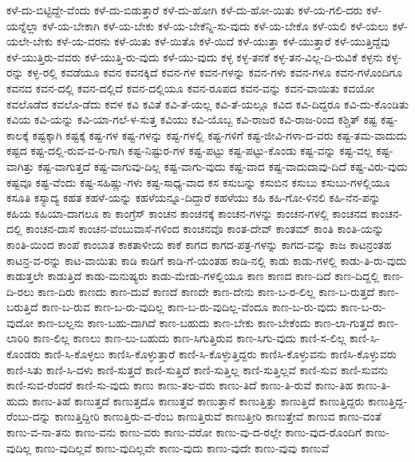 {ಕಳೆ-ದು-ಬಿಟ್ಟಿದ್ದೇ-ವೆಂದು
ಕಳೆ-ದು-ಬಿಡುತ್ತಾರೆ
ಕಳೆ-ದು-ಹೋಗಿ
ಕಳೆ-ದು-ಹೋ-ಯಿತು
ಕಳೆ-ಯ-ಗಲಿ-ದರು
ಕಳೆ-ಯನ್ನೆಲ್ಲಾ
ಕಳೆ-ಯ-ಬೇಕಾಗಿ
ಕಳೆ-ಯ-ಬೇಕು
ಕಳೆ-ಯ-ಬೇಕೆನ್ನಿ-ಸು-ವುದು
ಕಳೆ-ಯ-ಬೇಕೊ
ಕಳೆ-ಯಲಿ
ಕಳೆ-ಯಲು
ಕಳೆ-ಯಲೇ-ಬೇಕು
ಕಳೆ-ಯ-ವರನು
ಕಳೆ-ಯಿತು
ಕಳೆ-ಯಿತೊ
ಕಳೆ-ಯಿದೆ
ಕಳೆ-ಯುತ್ತಾ
ಕಳೆ-ಯುತ್ತಾರೆ
ಕಳೆ-ಯುತ್ತಿದ್ದೆವು
ಕಳೆ-ಯುತ್ತಿರು-ವವರು
ಕಳೆ-ಯುತ್ತಿ-ರು-ವುದು
ಕಳೆ-ಯು-ವುದು
ಕಳ್ಳ
ಕಳ್ಳ-ತನಕೆ
ಕಳ್ಳ-ತನ-ವಿಲ್ಲ-ದಿ-ರುವಿಕೆ
ಕಳ್ಳನು
ಕಳ್ಳ-ರನ್ನು
ಕಳ್ಳ-ರಲ್ಲಿ
ಕವಡೆಯೂ
ಕವನ
ಕವನಕ್ಕಿದೆ
ಕವನ-ಗಳ
ಕವನ-ಗಳನ್ನು
ಕವನ-ಗಳು
ಕವನ-ಗಳೂ
ಕವನ-ಗಳೊಂದಿಗೂ
ಕವನದ
ಕವನ-ದಲ್ಲಿ
ಕವನ-ದಲ್ಲಿದೆ
ಕವನ-ದಲ್ಲಿಯೂ
ಕವನ-ರೂಪದ
ಕವನ-ವನ್ನು
ಕವನ-ವಾಯಿತು
ಕವಯೋ
ಕವಲೊಡೆದ
ಕವಲೊ-ಡೆದು
ಕವಳ
ಕವಿ
ಕವಿತೆ
ಕವಿ-ತೆ-ಯಲ್ಲ
ಕವಿ-ತೆ-ಯಲ್ಲೂ
ಕವಿದ
ಕವಿ-ದಿದ್ದರೂ
ಕವಿ-ದು-ಕೊಂಡಿತು
ಕವಿಯ
ಕವಿ-ಯನ್ನು
ಕವಿ-ಯಾ-ಗಲೆ-ಳ-ಸುತ್ತ
ಕವಿಯು
ಕವಿ-ಯೊಬ್ಬ
ಕವಿ-ರಾಜರ
ಕವಿ-ರಾಜ-ರಿಂದ
ಕಶ್ಚಿತ್
ಕಷ್ಟ
ಕಷ್ಟ-ಕಾಲಕ್ಕೆ
ಕಷ್ಟಕ್ಕಾಗಿ
ಕಷ್ಟಕ್ಕೆ
ಕಷ್ಟ-ಗಳ
ಕಷ್ಟ-ಗಳನ್ನು
ಕಷ್ಟ-ಗಳಲ್ಲಿ
ಕಷ್ಟ-ಗಳಿಗೆ
ಕಷ್ಟ-ಜೀವಿ-ಗಳಾ-ದ-ವರು
ಕಷ್ಟ-ತಮ-ವಾದುದು
ಕಷ್ಟದ
ಕಷ್ಟ-ದಲ್ಲಿ-ರುವ-ವ-ರಿ-ಗಾಗಿ
ಕಷ್ಟ-ನಿಷ್ಟುರ-ಗಳ
ಕಷ್ಟ-ಪಟ್ಟು
ಕಷ್ಟ-ಪಟ್ಟು-ಕೊಂಡು
ಕಷ್ಟ-ವನ್ನು
ಕಷ್ಟ-ವಲ್ಲ
ಕಷ್ಟ-ವಾಗಿತ್ತು
ಕಷ್ಟ-ವಾಗುತ್ತದೆ
ಕಷ್ಟ-ವಾಗುವು-ದಿಲ್ಲ
ಕಷ್ಟ-ವಾಗು-ವುದು
ಕಷ್ಟ-ವಾದ
ಕಷ್ಟ-ವಾದುದಾವು-ದಿದೆ
ಕಷ್ಟ-ವಿರು-ವುದು
ಕಷ್ಟವೂ
ಕಷ್ಟ-ವೆಂದು
ಕಷ್ಟ-ಸಹಿಷ್ಣು-ಗಳು
ಕಷ್ಟ-ಸಾಧ್ಯ-ವಾದ
ಕಸ
ಕಸುಬನ್ನು
ಕಸುಬಿನ
ಕಸುಬು
ಕಸುಬು-ಗಳಲ್ಲಿಯೂ
ಕಸೂತಿ
ಕಸ್ಯಾದ್ಯ
ಕಹತ
ಕಹಳೆ-ಯನ್ನು
ಕಹಳೆಯನ್ನೂ-ದಿದ್ದಾರೆ
ಕಹಳೆಯು
ಕಹಿ
ಕಹಿ-ಗೋ-ಳಿನಲಿ
ಕಹಿ-ನೆನ-ಪನ್ನು
ಕಹಿಯ
ಕಹಿಯಾ-ದಾಗಲೂ
ಕಾ
ಕಾಂಗ್ರೆಸ್
ಕಾಂಚನ
ಕಾಂಚನಕ್ಕೆ
ಕಾಂಚನ-ಗಳನ್ನು
ಕಾಂಚನ-ಗಳಲ್ಲಿ
ಕಾಂಚನದ
ಕಾಂಚನ-ದಲ್ಲಿ
ಕಾಂಚನ-ದಾಸೆ
ಕಾಂಚನ-ವೆಂಬುವಾಸೆ-ಗಳಿಂದ
ಕಾಂಚನವೊ
ಕಾಂತ-ದೇವ್
ಕಾಂತಮ್
ಕಾಂತಿ
ಕಾಂತಿ-ಯನ್ನು
ಕಾಂತಿ-ಯಿಂದ
ಕಾಂಪೆ
ಕಾಂಬಾತ
ಕಾಕತಾಳೀಯ
ಕಾಕೆ
ಕಾಗದ
ಕಾಗದ-ಪತ್ರ-ಗಳನ್ನು
ಕಾಗದ-ವನ್ನು
ಕಾಜ
ಕಾಟನ್ರಂತಹ
ಕಾಟನ್ರ-ವ-ರನ್ನು
ಕಾಟ-ವಾಯಿತು
ಕಾಡಿ
ಕಾಡಿಗೆ
ಕಾಡಿ-ಗೆ-ಯಂತಹ
ಕಾಡಿ-ನಲ್ಲಿ
ಕಾಡು
ಕಾಡು-ಗಳಲ್ಲಿ
ಕಾಡು-ತಿ-ರು-ವುದು
ಕಾಡುತ್ತಲೇ
ಕಾಡುತ್ತಿದೆ
ಕಾಡು-ಮನುಷ್ಯರು
ಕಾಡು-ಮೇಡು-ಗಳಲ್ಲಿಯೂ
ಕಾಣ
ಕಾಣದ
ಕಾಣ-ದಿದೆ
ಕಾಣ-ದಿದ್ದಲ್ಲಿ
ಕಾಣ-ದಿ-ರಲು
ಕಾಣ-ದಿರು
ಕಾಣದು
ಕಾಣ-ದುವೆ
ಕಾಣದೆ
ಕಾಣದೇ
ಕಾಣ-ದೇನು
ಕಾಣ-ಬ-ರ-ಲಿಲ್ಲ
ಕಾಣ-ಬ-ರುತ್ತದೆ
ಕಾಣ-ಬರುತ್ತಿದೆ
ಕಾಣ-ಬ-ರುವ
ಕಾಣ-ಬ-ರು-ವುದಿಲ್ಲ
ಕಾಣ-ಬ-ರು-ವುದಿಲ್ಲ-ವೆಂದೂ
ಕಾಣ-ಬ-ರು-ವುದು
ಕಾಣ-ಬ-ರು-ವುದೋ
ಕಾಣ-ಬಲ್ಲನು
ಕಾಣ-ಬಹು-ದಾಗಿದೆ
ಕಾಣ-ಬಹುದು
ಕಾಣ-ಬೇಕು
ಕಾಣ-ಬೇಕೆಂದು
ಕಾಣ-ಲಾ-ಗುತ್ತದೆ
ಕಾಣ-ಲಾರಿರಿ
ಕಾಣ-ಲಿಲ್ಲ
ಕಾಣಲು
ಕಾಣ-ಲು-ಬಹುದು
ಕಾಣ-ಸಿಗುತ್ತಿರುವ
ಕಾಣ-ಸಿಗು-ವುದು
ಕಾಣಿ-ಸ-ಲಿಲ್ಲ
ಕಾಣಿ-ಸಿ-ಕೊಂಡರು
ಕಾಣಿ-ಸಿ-ಕೊಳ್ಳಲು
ಕಾಣಿಸಿ-ಕೊಳ್ಳುತ್ತಾರೆ
ಕಾಣಿ-ಸಿ-ಕೊಳ್ಳುತ್ತಿದ್ದರು
ಕಾಣಿಸಿ-ಕೊಳ್ಳುವನು
ಕಾಣಿಸಿ-ಕೊಳ್ಳುವರು
ಕಾಣಿ-ಸಿತು
ಕಾಣಿ-ಸಿ-ದಳು
ಕಾಣಿ-ಸುತ್ತದೆ
ಕಾಣಿ-ಸುತ್ತಿದೆ
ಕಾಣಿ-ಸುತ್ತಿಲ್ಲ
ಕಾಣಿ-ಸುತ್ತಿಲ್ಲವೆ
ಕಾಣಿ-ಸುವ
ಕಾಣಿ-ಸುವನು
ಕಾಣಿ-ಸುವ-ರೆಂದರೆ
ಕಾಣಿ-ಸು-ವುದು
ಕಾಣು
ಕಾಣು-ತಲ-ವರು
ಕಾಣು-ತಿದೆ
ಕಾಣು-ತಿ-ರುವೆ
ಕಾಣು-ತಿಹ
ಕಾಣು-ತಿ-ಹುದು
ಕಾಣು-ತಿಹೆ
ಕಾಣುತ್ತದೆ
ಕಾಣುತ್ತದೊ
ಕಾಣುತ್ತವೆ
ಕಾಣುತ್ತಾನೆ
ಕಾಣುತ್ತಿತ್ತು
ಕಾಣುತ್ತಿದೆ
ಕಾಣುತ್ತಿದ್ದರು
ಕಾಣುತ್ತಿದ್ದ-ರೆಂಬು-ದನ್ನು
ಕಾಣುತ್ತಿದ್ದೀರಿ
ಕಾಣುತ್ತಿರು-ವ-ರೆಂಬ
ಕಾಣುತ್ತಿರುವೆ
ಕಾಣುತ್ತೀರಿ
ಕಾಣುತ್ತೇವೆ
ಕಾಣುವ
ಕಾಣು-ವಂತೆ
ಕಾಣು-ವ-ನಾ-ತನು
ಕಾಣು-ವನು
ಕಾಣು-ವರು
ಕಾಣು-ವರೋ
ಕಾಣು-ವು-ದ-ರಲ್ಲೇ
ಕಾಣು-ವುದ-ರೊಂದಿಗೆ
ಕಾಣು-ವುದಿಲ್ಲ
ಕಾಣು-ವುದಿಲ್ಲವೆ
ಕಾಣು-ವುದಿಲ್ಲವೇ
ಕಾಣು-ವುದು
ಕಾಣು-ವುದೇ
ಕಾಣು-ವುವು
ಕಾಣುವೆ
}
